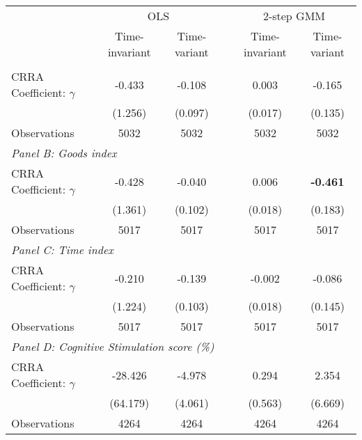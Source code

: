 {
\begin{tabular}{l*{5}{c}}
\toprule
                &\multicolumn{2}{c}{OLS} && \multicolumn{2}{c}{2-step GMM}\\ \cline{2-3} \cline{5-6}
                	& Time-invariant & Time-variant && Time-invariant & Time-variant \\
\midrule
\addlinespace \multicolumn{6}{l}{\textit{Panel A: HOME index}} \\
CRRA Coefficient: $\gamma$&   -0.433         &     -0.108      &       &    0.003         &       -0.165           \\
                &  (1.256)         &      (0.097)           & &  (0.017)         &       (0.135)           \\
\midrule
Observations    &     5032         &     5032   &      &     5032         &     5032         \\

\midrule

 \multicolumn{6}{l}{\textit{Panel B: Goods index}} \\
CRRA Coefficient: $\gamma$&   -0.428         &      -0.040     &       &    0.006         &     \textbf{-0.461\sym{**} }            \\
                &  (1.361)         &       (0.102)          & &  (0.018)         &        (0.183)          \\
\midrule
Observations    &     5017         &     5017    &     &     5017         &     5017         \\

\midrule

 \multicolumn{6}{l}{\textit{Panel C: Time index}} \\
CRRA Coefficient: $\gamma$&   -0.210         &      -0.139       &     &   -0.002         &         -0.086           \\
                &  (1.224)         &       (0.103)          & &  (0.018)         &         (0.145)         \\
\midrule
Observations    &     5017         &     5017         & &    5017         &     5017         \\

\midrule

 \multicolumn{6}{l}{\textit{Panel D: Cognitive Stimulation score (\%)}} \\
CRRA Coefficient: $\gamma$&  -28.426         &     -4.978  &            &    0.294         &      2.354               \\
                & (64.179)         &       (4.061)          & &  (0.563)         &        (6.669)           \\
\addlinespace
\midrule
Observations    &     4264         &     4264         &   &  4264         &     4264         \\


\end{tabular}}
